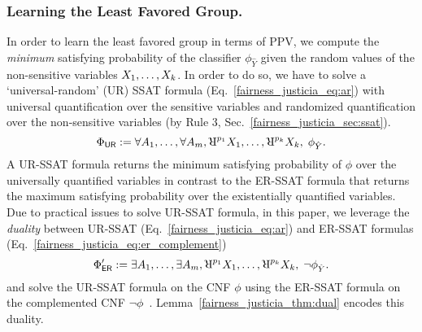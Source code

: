 \subsubsection{Learning the Least Favored Group.}
In order to learn the least favored group in terms of PPV, we  compute the \textit{minimum} satisfying probability of the classifier $ \phi_{\hat{Y}} $ given the random values of the non-sensitive variables $ X_1, \dots, X_{k} $. In order to do so, we have to solve a `universal-random' (UR) SSAT formula (Eq.~\eqref{fairness_justicia_eq:ar}) with  universal quantification over the sensitive variables and randomized quantification over the non-sensitive variables (by Rule 3, Sec.~\ref{fairness_justicia_sec:ssat}).
\begin{equation}
\Phi_{\mathsf{UR}} := \forall A_1,\dots, \forall A_{\numsensitive},
\R^{p_{1}}X_1, \dots, \R^{p_{\numnonsensitive}}X_{\numnonsensitive},   \; \phi_{\hat{Y}}.
\label{fairness_justicia_eq:ar}
\end{equation}
A UR-SSAT formula returns the minimum satisfying probability of $ \phi $ over the universally quantified variables in contrast to the ER-SSAT formula that returns the maximum satisfying  probability over the existentially quantified variables.  
Due to practical issues to solve UR-SSAT formula, in this paper, we leverage the \textit{duality} between UR-SSAT (Eq.~\eqref{fairness_justicia_eq:ar}) and ER-SSAT formulas (Eq.~\eqref{fairness_justicia_eq:er_complement}) 
\begin{equation}
\Phi'_{\mathsf{ER}} := \exists A_1,\dots, \exists A_{\numsensitive},
\R^{p_{1}}X_1, \dots, \R^{p_{\numnonsensitive}}X_{\numnonsensitive},   \; \neg \phi_{\hat{Y}}.
\label{fairness_justicia_eq:er_complement}
\end{equation}
and solve the UR-SSAT formula on the CNF $ \phi $ using the ER-SSAT formula on the complemented CNF $ \neg \phi $~\cite{littman2001stochastic}. Lemma~\ref{fairness_justicia_thm:dual} encodes this duality.
